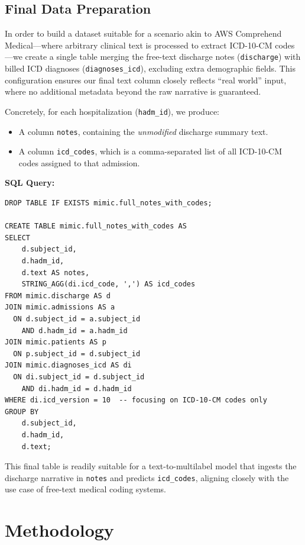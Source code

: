\documentclass[12pt,a4paper]{report}
\begin{document}
\section{Final Data Preparation}
\label{sec:final-data-prep}

In order to build a dataset suitable for a scenario akin to AWS Comprehend Medical—where arbitrary clinical text is processed to extract ICD-10-CM codes—we create a single table merging the free-text discharge notes (\texttt{discharge}) with billed ICD diagnoses (\texttt{diagnoses\_icd}), excluding extra demographic fields. This configuration ensures our final text column closely reflects “real world” input, where no additional metadata beyond the raw narrative is guaranteed. 

Concretely, for each hospitalization (\texttt{hadm\_id}), we produce:
\begin{itemize}
    \item A column \texttt{notes}, containing the \textit{unmodified} discharge summary text. 
    \item A column \texttt{icd\_codes}, which is a comma-separated list of all ICD-10-CM codes assigned to that admission.
\end{itemize}

\noindent \textbf{SQL Query:}
\begin{verbatim}
DROP TABLE IF EXISTS mimic.full_notes_with_codes;

CREATE TABLE mimic.full_notes_with_codes AS
SELECT
    d.subject_id,
    d.hadm_id,
    d.text AS notes,
    STRING_AGG(di.icd_code, ',') AS icd_codes
FROM mimic.discharge AS d
JOIN mimic.admissions AS a
  ON d.subject_id = a.subject_id
    AND d.hadm_id = a.hadm_id
JOIN mimic.patients AS p
  ON p.subject_id = d.subject_id
JOIN mimic.diagnoses_icd AS di
  ON di.subject_id = d.subject_id
    AND di.hadm_id = d.hadm_id
WHERE di.icd_version = 10  -- focusing on ICD-10-CM codes only
GROUP BY
    d.subject_id,
    d.hadm_id,
    d.text;
\end{verbatim}


\noindent This final table is readily suitable for a text-to-multilabel model that ingests the discharge narrative in \texttt{notes} and predicts \texttt{icd\_codes}, aligning closely with the use case of free-text medical coding systems.




\chapter{Methodology}
\end{document}

